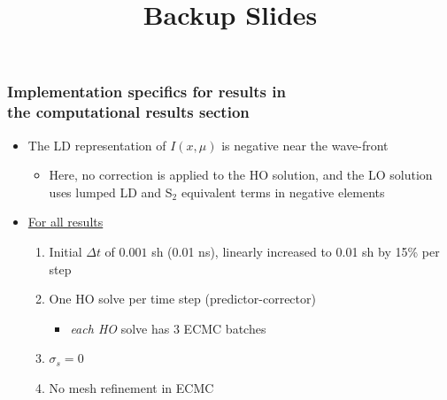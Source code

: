 \documentclass[xcolor=dvipsnames,hyperref={pdfpagelabels=false},unknownkeysallowed,
handout]{beamer}
\renewcommand{\u}[1]{\underline{#1}}
\newlength{\wideitemsep}
\let\olditem\item
\renewcommand{\item}{\setlength{\itemsep}{\wideitemsep}\olditem}
\begin{document}
\appendix
{}
\setcounter{finalframe}{\value{framenumber}}

\title{Backup Slides}
\author{}
\date{}
\begin{frame}
    \frametitle{Implementation specifics for results in  \\ the computational
                results section }
    \begin{itemize}
    \item The LD representation of $I(x,\mu)$ is negative near the wave-front
        \begin{itemize}
            \item Here, no correction is applied to the HO solution, and the LO
                solution uses lumped LD and S$_2$ equivalent terms in negative elements
        \end{itemize}
     
 \item \u{For all results}
        \begin{enumerate}
    \item Initial $\Delta t$ of $0.001$ sh (0.01 ns), linearly increased to 0.01 sh by 15\% per step
    \item One HO solve per time step (predictor-corrector)
        \begin{itemize}
            \item \emph{each HO} solve has 3 ECMC batches
        \end{itemize}
    \item $\sigma_s=0$
    \item No mesh refinement in ECMC
    \end{enumerate} 
    \end{itemize}
\end{frame}
\end{document}
